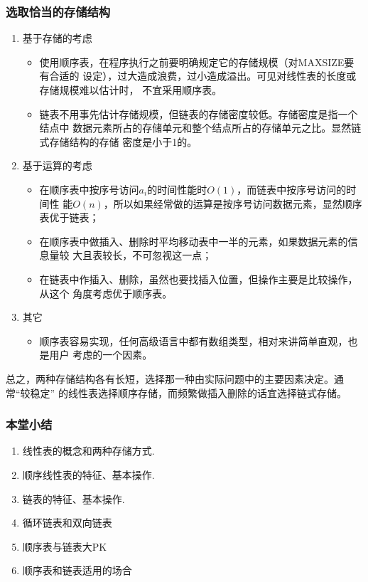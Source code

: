 \begin{frame}
  \frametitle{选取恰当的存储结构}
  \begin{enumerate}
  \item 基于存储的考虑

    \begin{itemize}
    \item 使用顺序表，在程序执行之前要明确规定它的存储规模（对MAXSIZE要有合适的
      设定），过大造成浪费，过小造成溢出。可见对线性表的长度或存储规模难以估计时，
      不宜采用顺序表。
    \item 链表不用事先估计存储规模，但链表的存储密度较低。存储密度是指一个结点中
      数据元素所占的存储单元和整个结点所占的存储单元之比。显然链式存储结构的存储
      密度是小于1的。
    \end{itemize}

   \newpage

 \item 基于运算的考虑
   \begin{itemize}
   \item 在顺序表中按序号访问$a_i$的时间性能时$O(1)$，而链表中按序号访问的时间性
     能$O(n)$，所以如果经常做的运算是按序号访问数据元素，显然顺序表优于链表；
   \item 在顺序表中做插入、删除时平均移动表中一半的元素，如果数据元素的信息量较
     大且表较长，不可忽视这一点；
   \item 在链表中作插入、删除，虽然也要找插入位置，但操作主要是比较操作，从这个
     角度考虑优于顺序表。
   \end{itemize}

   \newpage

 \item 其它
   \begin{itemize}
   \item 顺序表容易实现，任何高级语言中都有数组类型，相对来讲简单直观，也是用户
     考虑的一个因素。
   \end{itemize}
  \end{enumerate}

  总之，两种存储结构各有长短，选择那一种由实际问题中的主要因素决定。通常“较稳定”
  的线性表选择顺序存储，而频繁做插入删除的话宜选择链式存储。
\end{frame}

\begin{frame}[fragile]
  \frametitle{本堂小结}
  \begin{enumerate}
  \item 线性表的概念和两种存储方式.
  \item 顺序线性表的特征、基本操作.
  \item 链表的特征、基本操作.
  \item 循环链表和双向链表
  \item 顺序表与链表大PK
  \item 顺序表和链表适用的场合
  \end{enumerate}
\end{frame}

